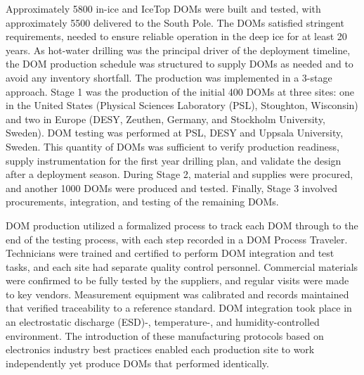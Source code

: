 Approximately 5800 in-ice and IceTop DOMs were built and tested, with
approximately 5500 delivered to the South Pole. The DOMs satisfied
stringent requirements, needed to ensure reliable operation in the deep ice
for at least 20 years. As hot-water drilling was the principal 
driver of the deployment timeline, the DOM production schedule was
structured to supply DOMs as needed and to avoid any inventory shortfall.
The production was implemented in a 3-stage approach. Stage 1 was
the production of the initial 400 DOMs at three sites: one in the United
States (Physical Sciences Laboratory (PSL), Stoughton, Wisconsin) and two
in Europe (DESY, Zeuthen, Germany, and Stockholm University,
Sweden). DOM testing was performed at PSL, DESY and Uppsala University,
Sweden. This
quantity of DOMs was sufficient to verify production readiness, supply
instrumentation for the first year drilling plan, and validate the design after a deployment
season.  During Stage 2, material and supplies were procured, and another
1000 DOMs were produced and tested. Finally, Stage 3 involved procurements,
integration, and testing of the remaining DOMs.

DOM production utilized a formalized process to track each DOM through to
the end of the testing process, with each step recorded in a DOM Process
Traveler.  Technicians were trained and certified to perform DOM
integration and test tasks, and each site had separate quality control
personnel. Commercial materials were confirmed to be fully tested by the
suppliers, and regular visits were made to key vendors.  Measurement
equipment was calibrated and records maintained that verified
traceability to a reference standard.  DOM integration took place in
an electrostatic discharge (ESD)-, temperature-, and humidity-controlled environment.  The introduction
of these manufacturing protocols based on electronics industry best
practices enabled each production site to work independently yet
produce DOMs that performed identically.

